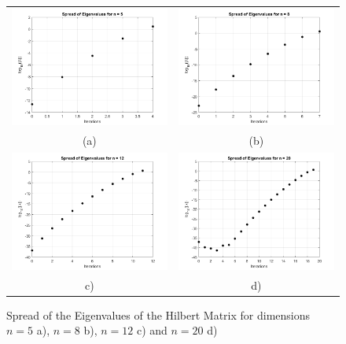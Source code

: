 \documentclass[a4paper,11pt]{article}
\begin{document}
\begin{figure}[!ht]
	\centering
	\begin{tabular}{cc}
		\includegraphics[width=.55\textwidth]{Hillbert_eig_n5} &\hspace{-25pt} \includegraphics[width=.55\textwidth]{Hillbert_eig_n8} \\
		(a) & (b)\\
		\includegraphics[width=.55\textwidth]{Hillbert_eig_n12} &\hspace{-25pt} \includegraphics[width=.55\textwidth]{Hillbert_eig_n20} \\
		c) & d)\\
	\end{tabular}
	\caption{Spread of the Eigenvalues of the Hilbert Matrix for dimensions $n=5$ a), $n=8$ b), $n=12$ c) and $n=20$ d)}
	\label{}
\end{figure}
\end{document}
